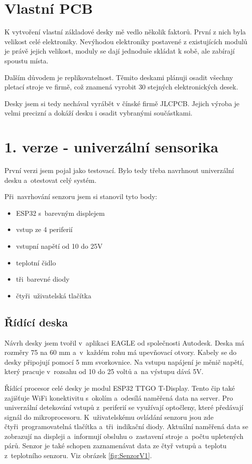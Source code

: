 \section{Vlastní PCB}
K vytvoření vlastní základové desky mě vedlo několik faktorů. První z nich byla velikost celé elektroniky. 
Nevýhodou elektroniky postavené z existujících modulů je právě jejich velikost, moduly se dají jednoduše skládat k sobě, ale zabírají spoustu místa. 
 
Dalším důvodem je replikovatelnost. Těmito deskami plánuji osadit všechny pletací stroje ve firmě, což znamená vyrobit 30 stejných elektronických desek.

Desky jsem si tedy nechával vyrábět v čínské firmě JLCPCB. Jejich výroba je velmi precizní a dokáží desku i osadit vybranými součástkami.



\section{1. verze - univerzální sensorika}

První verzi jsem pojal jako testovací. Bylo tedy třeba navrhnout univerzální desku a~otestovat celý systém.\newline

Při~navrhování senzoru jsem si stanovil tyto body:
\begin{itemize}
    \item ESP32 s~barevným displejem
    \item vstup ze 4 periferií
    \item vstupní napětí od 10 do 25V
    \item teplotní čidlo
    \item tři~barevné diody
    \item čtyři~uživatelská tlačítka
\end{itemize}


\subsection{Řídící deska}
Návrh desky jsem tvořil v~aplikaci EAGLE od společnosti Autodesk. 
Deska má rozměry 75 na 60 mm a~v~každém rohu má upevňovací otvory.
Kabely se do desky připojují pomocí 5 mm svorkovnice.
Na vstupu napájení je měnič napětí, který pracuje v~rozsahu od 10 do 25 voltů a~na výstupu dává 5V. 

Řídící procesor celé desky je modul ESP32 TTGO T-Display.
Tento čip také zajišťuje WiFi konektivitu s~okolím a~odesílá naměřená data na server.
Pro univerzální detekování vstupů z~periferií se využívají optočleny, které předávají signál do mikroprocesoru.
K~uživatelskému ovládání senzoru jsou zde čtyři~programovatelná tlačítka a~tři~indikační diody.
Aktuální naměřená data se zobrazují na displeji a~informují obsluhu o~zastavení stroje a~počtu upletených párů.
Senzor je také schopen zaznamenávat data ze čtyř vstupů a~teplotu z~teplotního senzoru. Viz obrázek \ref{fig:SenzorV1}.

